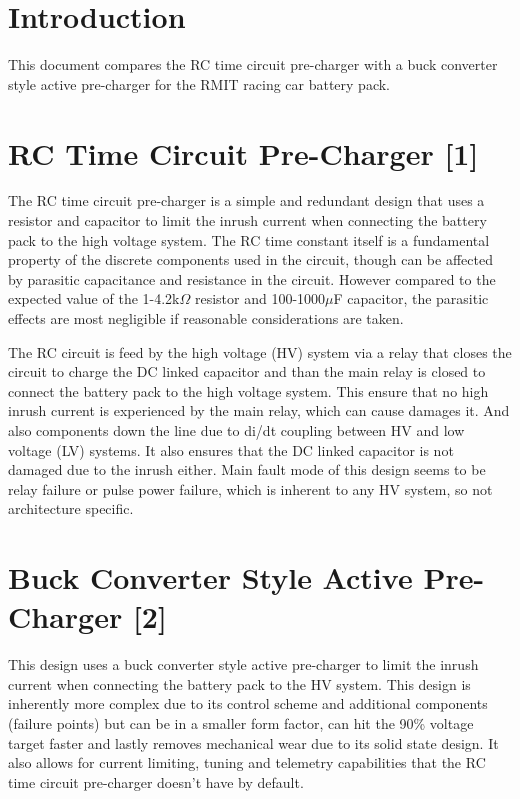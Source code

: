 \documentclass{article}
\begin{document}
\section{Introduction}
This document compares the RC time circuit pre-charger with a buck converter style active pre-charger for the 
RMIT racing car battery pack.

\section{RC Time Circuit Pre-Charger [1]}
The RC time circuit pre-charger is a simple and redundant design that uses a resistor and capacitor to limit the inrush current when connecting the battery
pack to the high voltage system. The RC time constant itself is a fundamental property of the discrete components used in the circuit, though can be affected
by parasitic capacitance and resistance in the circuit. However compared to the expected value of the 1-4.2k$\Omega$ resistor and 100-1000$\mu$F capacitor, 
the parasitic effects are most negligible if reasonable considerations are taken.

\vspace{0.5cm}
The RC circuit is feed by the high voltage (HV) system via a relay that closes the circuit to charge the DC linked capacitor and than the main relay is closed to
connect the battery pack to the high voltage system. This ensure that no high inrush current is experienced by the main relay, which can cause damages it. And also components
down the line due to di/dt coupling between HV and low voltage (LV) systems. It also ensures that the DC linked capacitor is not damaged due to the inrush either. Main 
fault mode of this design seems to be relay failure or pulse power failure, which is inherent to any HV system, so not architecture specific.


\section{Buck Converter Style Active Pre-Charger [2]}
This design uses a buck converter style active pre-charger to limit the inrush current when connecting the battery pack to the HV system. This design is inherently more complex
due to its control scheme and additional components (failure points) but can be in a smaller form factor, can hit the 90\% voltage target faster and lastly removes mechanical wear due
to its solid state design. It also allows for current limiting, tuning and telemetry capabilities that the RC time circuit pre-charger doesn't have by default.
\end{document}
